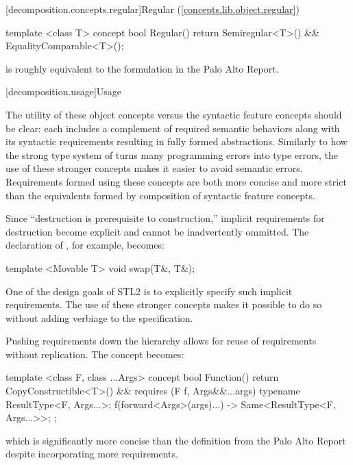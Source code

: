 [decomposition.concepts.regular]{Regular (\ref{concepts.lib.object.regular})}
\begin{codeblock}
template <class T>
concept bool Regular() {
  return Semiregular<T>() &&
    EqualityComparable<T>();
}
\end{codeblock}
 is roughly equivalent to the formulation in the Palo Alto Report.

[decomposition.usage]{Usage}

\pnum
The utility of these object concepts versus the syntactic feature concepts should be clear: each
includes a complement of required semantic behaviors along with its syntactic requirements resulting
in fully formed abstractions. Similarly to how the strong type system of \Cpp turns many programming
errors into type errors, the use of these stronger concepts makes it easier to avoid semantic errors.
Requirements formed using these concepts are both more concise and more strict than the equivalents
formed by composition of syntactic feature concepts.

\pnum
Since ``destruction is prerequisite to construction,'' implicit requirements for destruction become
explicit and cannot be inadvertently ommitted. The declaration of , for example, becomes:
\begin{codeblock}
template <Movable T>
void swap(T&, T&);
\end{codeblock}
One of the design goals of STL2 is to explicitly specify such implicit requirements. The use of these
stronger concepts makes it possible to do so without adding verbiage to the specification.

\pnum
Pushing requirements down the hierarchy allows for reuse of requirements without replication. The
 concept becomes:
\begin{codeblock}
template <class F, class ...Args>
concept bool Function() {
  return CopyConstructible<T>() &&
    requires (F f, Args&&...args) {
      typename ResultType<F, Args...>;
      { f(forward<Args>(args)...) } -> Same<ResultType<F, Args...>{}>;
    };
}
\end{codeblock}
which is significantly more concise than the definition from the Palo Alto Report despite
incorporating more requirements.
